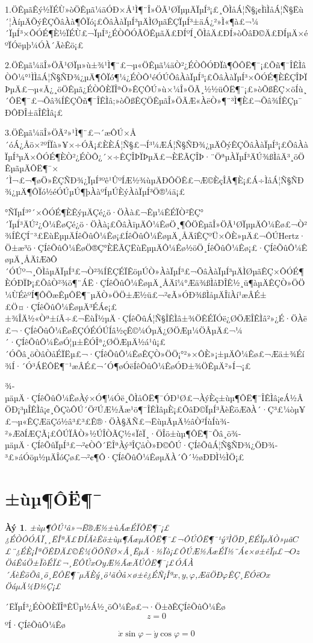 \documentclass[A4,twoside]{ctexart}
\begin{document}
1.ÖÊµãÊý½ÏÉÙ»òÖÊµã¼äÓÐ×Å¹Ì¶¨Î»ÖÃ¹ØÏµµÄÏµÍ³¡£¸ÕÌåÁ¦Ñ§¡¢ÌìÌåÁ¦Ñ§Ëù´¦ÀíµÄÕýÊÇÕâÀà¶ÔÏó¡£ÕâÀàÏµÍ³µÄÌØµãÊÇÏµÍ³±äÁ¿²»Ì«¶à£¬¼´ÏµÍ³×ÔÓÉ¶È½ÏÉÙ£¬ÏµÍ³¿ÉÒÔÓÃÖÊµãÄ£ÐÍºÍ¸ÕÌåÄ£ÐÍ»òÕâÐ©Ä£ÐÍµÄ×éºÏÓëµþ¼ÓÀ´ÃèÊö¡£

2.ÖÊµã¼äÎ»ÖÃ¹ØÏµ»ù±¾¹Ì¶¨£¬µ«ÖÊµã¼äÒ²¿ÉÒÔÓÐÏà¶ÔÔË¶¯¡£Õñ¶¯ÎÊÌâÒÔ¼°¹ÌÌåÁ¦Ñ§ÑÐ¾¿µÄ¶ÔÏó¶¼¿ÉÒÔ¹éÓÚÕâÀàÏµÍ³¡£ÕâÀàÏµÍ³×ÔÓÉ¶ÈÊÇÎÞÏÞµÄ£¬µ«Ã¿¸öÖÊµã¿ÉÒÔÈÏÎªÖ»ÊÇÔÚ»ù×¼Î»ÖÃ¸½½üÔË¶¯¡£»òÕßÊÇ×öÍù¸´ÔË¶¯£¬Õâ¾ÍÊÇÕñ¶¯ÎÊÌâ;»òÕßÊÇÖÊµãÎ»ÖÃÆ«ÀëÒ»¶¨³Ì¶È£¬Õâ¾ÍÊÇµ¯ÐÔÐÎ±äÎÊÌâ¡£

3.ÖÊµã¼äÎ»ÖÃ²»¹Ì¶¨£¬´æÔÚ×Å´óÁ¿Åö×²ºÍÏà»¥×÷ÓÃ¡£ÈÈÁ¦Ñ§£¬Í³¼ÆÁ¦Ñ§ÑÐ¾¿µÄÕýÊÇÕâÀàÏµÍ³¡£ÕâÀàÏµÍ³µÄ×ÔÓÉ¶ÈÒ²¿ÉÒÔ¿´×÷ÊÇÎÞÏÞµÄ£¬ÈËÃÇÎÞ·¨ÖªµÀÏµÍ³ÄÚ¾ßÌåÄ³¸öÖÊµãµÄÔË¶¯×´Ì¬£¬¶øÖ»ÊÇÑÐ¾¿ÏµÍ³ºê¹ÛºÍÆ½¾ùµÄÐÔÖÊ£¬Æ©ÈçÎÂ¶È¡£Á÷ÌåÁ¦Ñ§ÑÐ¾¿µÄ¶ÔÏó½éÓÚµÚ¶þÀàºÍµÚÈýÀàÏµÍ³Ö®¼ä¡£

°ÑÏµÍ³°´×ÔÓÉ¶ÈÊýµÄÇé¿ö·ÖÀà£¬Êµ¼ÊÉÏÒ²ÊÇ°´ÏµÍ³ÄÚ²¿Ô¼ÊøÇé¿ö·ÖÀà¡£ÕâÀïµÄÔ¼ÊøÖ¸¶ÔÖÊµãÎ»ÖÃ¹ØÏµµÄÔ¼Êø£¬Ò²¾ÍÊÇÍ¨³£ËùËµµÄÍêÕûÔ¼Êø¡£ÍêÕûÔ¼ÊøµÄ¸ÅÄîÊÇºÜ×ÔÈ»µÄ£¬ÔÚHertz·Ö±æ³ö·ÇÍêÕûÔ¼ÊøÖ®Ç°ÈËÃÇËùËµµÄÔ¼Êø½öÖ¸ÍêÕûÔ¼Êø¡£·ÇÍêÕûÔ¼ÊøµÄ¸ÅÄîÆðÔ´ÓÚº¬¸ÕÌåµÄÏµÍ³£¬Ò²¾ÍÊÇÉÏÊöµÚÒ»ÀàÏµÍ³£¬ÕâÀàÏµÍ³µÄÌØµãÊÇ×ÔÓÉ¶ÈÓÐÏÞ¡£ÕâÒ²¾ö¶¨ÁË·ÇÍêÕûÔ¼ÊøµÄ¸ÅÄî¼°Æä¾ßÌåÐÎÊ½¸ü¶àµÄÊÇÒ»ÖÖ¼ÙÉèºÍ¶ÔÕæÊµÔË¶¯µÄÒ»ÖÖ±Æ½ü£¬²¢Ã»ÓÐ¾ßÌåµÄÎïÀí¹æÂÉ±£Ö¤·ÇÍêÕûÔ¼ÊøµÄ³ÉÁ¢¡£±¾ÎÄ½«Òª±íÃ÷£¬ËùÎ½µÄ·ÇÍêÕûÁ¦Ñ§ÎÊÌâ±¾ÖÊÉÏÓë¿ØÖÆÎÊÌâ²»¿É·ÖÀë£¬·ÇÍêÕûÔ¼ÊøÊÇÓÉÓÚÍâ½çÊ©¼ÓµÄ¿ØÖÆµ¼ÖÂµÄ£¬¼´·ÇÍêÕûÔ¼ÊøÓ¦µ±ÊÓÎª¿ØÖÆµÄ½á¹û¡£´ÓÕâ¸öÒâÒåÉÏËµ£¬·ÇÍêÕûÔ¼ÊøÊÇÒ»ÖÖ¡°²»×ÔÈ»¡±µÄÔ¼Êø£¬Æä±¾Éí¾Í·´Ó³ÁËÔË¶¯¹æÂÉ£¬´Ó¶øÓëÍêÕûÔ¼ÊøÓÐ±¾ÖÊµÄ²»Í¬¡£

¾­µäµÄ·ÇÍêÕûÔ¼ÊøÀý×Ó¶¼Óë¸ÕÌåÔË¶¯ÓÐ¹Ø£¬ÀýÈç±ùµ¶ÔË¶¯ÎÊÌâ¡¢Á½ÂÖÐ¡³µÎÊÌâ¡¢¸ÕÇòÔÚ´Ö²ÚÆ½Ãæ¹ö¶¯ÎÊÌâµÈ¡£ÕâÐ©ÏµÍ³ÃèÊöÆðÀ´·Ç³£¼òµ¥£¬µ«ÊÇÆäÇó½â³£³£Ê®·ÖÀ§ÄÑ£¬ËùµÃµÄ½âÒ²ÍùÍù¾­²»ÆðÍÆÇÃ¡£ÔÚÏÂÒ»½ÚÎÒÃÇ½«ÏêÏ¸·ÖÎö±ùµ¶ÔË¶¯Õâ¸ö¾­µäµÄ·ÇÍêÕûÏµÍ³£¬²¢ÒÔ´ËÎªÀý³ÎÇåÒ»Ð©ÔÚ·ÇÍêÕûÁ¦Ñ§ÑÐ¾¿ÖÐ¾­³£»áÓöµ½µÄÎóÇø£¬²¢¶Ô·ÇÍêÕûÔ¼ÊøµÄÀ´Ô´½øÐÐÌ½ÌÖ¡£

\section{±ùµ¶ÔË¶¯}
\label{sec:ice}
\newtheorem{example}{Àý}

\begin{example}
  ±ùµ¶ÔÚ¹â»¬Ë®Æ½±ùÃæÉÏÔË¶¯¡£¿ÉÒÔÓÃÏ¸¸ËÎªÄ£ÐÍÃèÊö±ùµ¶ÃæµÄÔË¶¯£¬ÔÚÔË¶¯¹ý³ÌÖÐ¸ËÉÏµÄÒ»µã$C$£¨¿ÉÈ¡ÎªÖÊÐÄ£©Ê¼ÖÕÑØ×Å¸ËµÄ·½Ïò¡£ÔÚÆ½ÃæÉÏ½¨Á¢×ø±êÏµ£¬$Oz$ÖáÊúÖ±ÏòÉÏ£¬¸ËÔÚ$xOy$Æ½ÃæÄÚÔË¶¯¡£ÓÃÀ´ÃèÊöÕâ¸ö¸ËÔË¶¯µÄÈý¸ö¹ãÒå×ø±ê¿ÉÑ¡Îª$x,y,\varphi$,ÆäÖÐ$\varphi$ÊÇ¸ËÓë$Ox$ÖáµÄ¼Ð½Ç¡£
\end{example}

´ËÏµÍ³¿ÉÒÔÈÏÎªÊÜµ½Á½¸öÔ¼Êø£¬·Ö±ðÊÇÍêÕûÔ¼Êø
\begin{equation}
  \label{eq:ice1}
  z = 0
\end{equation}
ºÍ·ÇÍêÕûÔ¼Êø
\begin{equation}
  \label{eq:ice2}
  \dot{x} \sin\varphi - \dot{y} \cos\varphi = 0
\end{equation}
\end{document}
